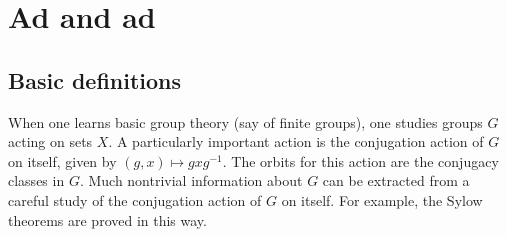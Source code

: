\documentclass[reqno]{amsart} 
\begin{document}
\section{Ad and ad}
\label{sec:orga45c298}

\subsection{Basic definitions}
\label{sec:org7eda827}
When one learns basic group theory (say of finite groups),
one studies groups $G$ acting on sets $X$.
A particularly important action is the conjugation action
of $G$ on itself,
given by $(g,x) \mapsto g x g^{-1}$.
The orbits for this action are the conjugacy classes in $G$.
Much nontrivial information about $G$ can be extracted
from a careful study of the conjugation action of $G$ on itself.
For example, the Sylow theorems are proved in this way.
\end{document}
